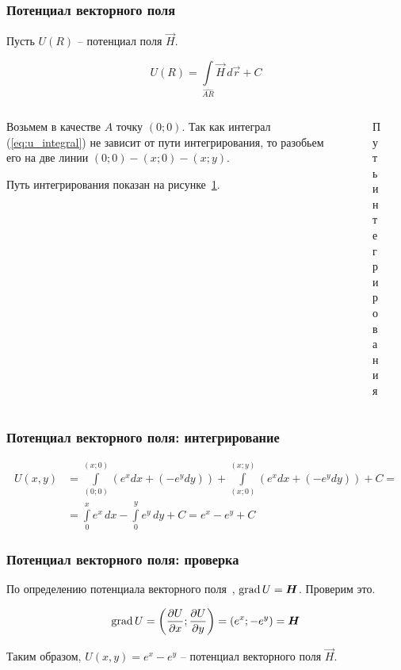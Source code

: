 \begin{frame}\frametitle{Потенциал векторного поля}
	Пусть \(U(R)\) -- потенциал поля \(\vec H\).

	\begin{equation}
		U(R) =
		\int\limits_{\widehat{AR}} \vec H \, d \vec r + C
		\label{eq:u_integral}
	\end{equation}


	\begin{columns}
		\begin{column}{0.5\textwidth}
			Возьмем в качестве $A$ точку $(0; 0)$.
			Так как интеграл (\ref{eq:u_integral}) не зависит от пути интегрирования,
			то разобьем его на две линии $(0; 0) - (x; 0) - (x; y)$.

      Путь интегрирования показан на рисунке~\ref{fig:integration_path}.
		\end{column}
		\begin{column}{0.5\textwidth}
			\begin{figure}
				\centering
        \caption{Путь интегрирования}\label{fig:integration_path}
			\end{figure}
		\end{column}
	\end{columns}

\end{frame}

\begin{frame}\frametitle{Потенциал векторного поля: интегрирование}
	\begin{align*}
		U(x, y) & = \int\limits_{(0; 0)}^{(x; 0)} \left(e^x dx + (-e^y dy) \right) +
		\int\limits_{(x; 0)}^{(x; y)} \left(e^x dx + (-e^y dy) \right) + C =         \\
		        & =
		\int\limits_{0}^{x} e^x \, dx - \int\limits_{0}^{y} e^y \, dy + C =
		e^{x} - e^{y} + C
	\end{align*}
\end{frame}

\begin{frame}\frametitle{Потенциал векторного поля: проверка}
	По определению потенциала векторного поля~\cite[ст.~269]{zorich}, $\grad U = \vec H$. Проверим это.

	\begin{equation*}
		\grad U =
		\left( \frac{\partial U}{\partial x}; \frac{\partial U}{\partial y} \right) =
		\left( e^x; -e^y \right)
		= \vec H
	\end{equation*}

	Таким образом, \(U(x,y) = e^{x} - e^{y}\) -- потенциал векторного поля \(\vec H\).
\end{frame}

